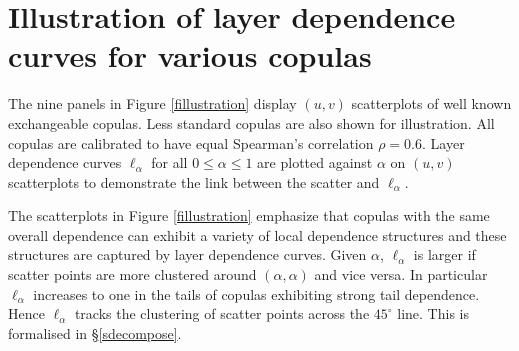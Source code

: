 \documentclass[authoryear]{elsarticle}
\newcommand{\fref}[1]{Figure \ref{#1}}
\newcommand{\sref}[1]{\S\ref{#1}}
\begin{document}
\section{Illustration of layer dependence curves for various copulas}\label{sldcurve}

The nine panels in \fref{fillustration} display $(u,v)$ scatterplots of well known exchangeable copulas. Less standard copulas are also shown for illustration. All copulas are calibrated to have equal Spearman's correlation $\rho=0.6$. Layer dependence curves $\ell_\alpha$ for all $0\le\alpha\le 1$ are plotted against $\alpha$ on $(u,v)$ scatterplots to demonstrate the link between the scatter and $\ell_\alpha$.

The scatterplots in \fref{fillustration}  emphasize that copulas with the same overall dependence can exhibit a variety of local dependence structures and these structures are captured by layer dependence curves. Given $\alpha$, $\ell_\alpha$ is larger if scatter points are more clustered around $(\alpha,\alpha)$ and vice versa. In particular $\ell_\alpha$ increases to one in the tails of copulas exhibiting strong tail dependence. Hence $\ell_\alpha$ tracks the clustering of scatter points across the $45^\circ$ line. This  is formalised in \sref{sdecompose}.
\end{document}
